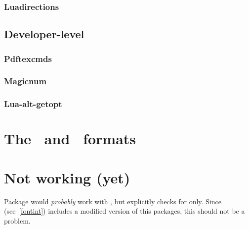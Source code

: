 \documentclass{lltxdoc}
\begin{document}
\subsubsection{Luadirections}

\subsection{Developer-level}

\subsubsection{Pdftexcmds}

\subsubsection{Magicnum}

\subsubsection{Lua-alt-getopt}

\section{The \luatex\ and \lualatex\ formats}

\section{Not working (yet)}

Package  would \emph{probably} work with \luatex, but explicitly
checks for \xetex only. Since  (see~\ref{fontint}) includes a
modified version of this packages, this should not be a problem.
\end{document}
